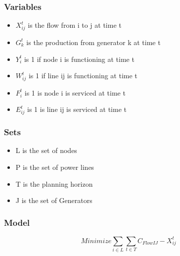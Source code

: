 \documentclass{article}
\begin{document}
	\subsubsection{Variables}
	\begin{itemize}
		
		\item $X_{ij}^{t}$ is the flow from i to j at time t
		\item $G_{k}^t$ is the production from generator k at time t
		\item $Y_i^t$ is 1 if node i is functioning at time t
		\item $W_{ij}^t$ is 1 if line ij is functioning at time t
		\item $F_i^t$ is 1 is node i is serviced at time t 
		\item $E_{ij}^t$ is 1 is line ij is serviced at time t	
	\end{itemize}
	\subsubsection{Sets}
	\begin{itemize}
		\item L is the set of nodes
		\item P is the set of power lines
		\item T is the planning horizon
		\item J is the set of Generators
	\end{itemize}
	\subsubsection{Model}
	$$	Minimize \sum_{i \in L} \sum_{t \in T} C_{FlowIJ}-X_{ij}^t $$
	
\end{document}
